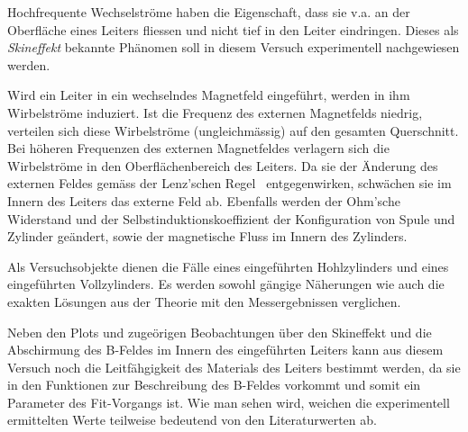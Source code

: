 Hochfrequente  Wechselstr\"ome  haben  die   Eigenschaft,  dass  sie  v.a.  an
der  Oberfl\"ache  eines  Leiters  fliessen  und  nicht  tief  in  den  Leiter
eindringen. Dieses als  \emph{Skineffekt} bekannte  Ph\"anomen soll  in diesem
Versuch experimentell nachgewiesen werden.

Wird  ein  Leiter  in  ein  wechselndes  Magnetfeld  eingef\"uhrt,  werden  in
ihm  Wirbelstr\"ome  induziert. Ist  die  Frequenz  des  externen  Magnetfelds
niedrig,  verteilen  sich  diese  Wirbelstr\"ome  (ungleichm\"assig)  auf  den
gesamten  Querschnitt.  Bei  h\"oheren  Frequenzen  des externen  Magnetfeldes
verlagern   sich   die   Wirbelstr\"ome  in   den   Oberfl\"achenbereich   des
Leiters. Da sie  der \"Anderung  des externen  Feldes gem\"ass  der Lenz'schen
Regel~\cite{ref:wikipedia:lenzscheRegel}  entgegenwirken,  schw\"achen sie  im
Innern  des  Leiters  das  externe  Feld  ab. Ebenfalls  werden  der  Ohm'sche
Widerstand und der Selbstinduktionskoeffizient der Konfiguration von Spule und
Zylinder ge\"andert, sowie der magnetische Fluss im Innern des Zylinders.

Als Versuchsobjekte dienen die  F\"alle eines eingef\"uhrten Hohlzylinders und
eines  eingef\"uhrten Vollzylinders. Es werden  sowohl g\"angige  N\"aherungen
wie  auch die  exakten  L\"osungen  aus der  Theorie  mit den  Messergebnissen
verglichen.

Neben den Plots  und zuge\"origen Beobachtungen \"uber den  Skineffekt und die
Abschirmung des B-Feldes im Innern  des eingef\"uhrten Leiters kann aus diesem
Versuch noch die  Leitf\"ahgigkeit des Materials des  Leiters bestimmt werden,
da sie in den Funktionen zur  Beschreibung des B-Feldes vorkommt und somit ein
Parameter des Fit-Vorgangs ist. Wie man  sehen wird, weichen die experimentell
ermittelten Werte teilweise bedeutend von den Literaturwerten ab.
